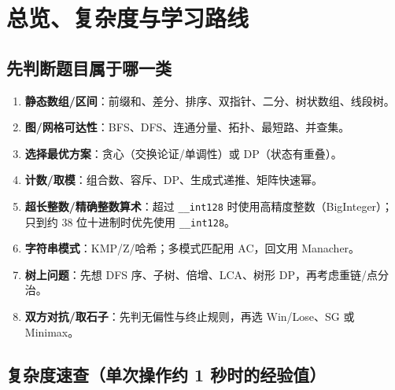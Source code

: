 \chapter{总览、复杂度与学习路线}\label{ux603bux89c8ux590dux6742ux5ea6ux4e0eux5b66ux4e60ux8defux7ebf}

\section{先判断题目属于哪一类}\label{ux5148ux5224ux65adux9898ux76eeux5c5eux4e8eux54eaux4e00ux7c7b}

\begin{enumerate}
\def\labelenumi{\arabic{enumi}.}
\tightlist
\item
  \textbf{静态数组/区间}：前缀和、差分、排序、双指针、二分、树状数组、线段树。
\item
  \textbf{图/网格可达性}：BFS、DFS、连通分量、拓扑、最短路、并查集。
\item
  \textbf{选择最优方案}：贪心（交换论证/单调性）或 DP（状态有重叠）。
\item
  \textbf{计数/取模}：组合数、容斥、DP、生成式递推、矩阵快速幂。
\item
  \textbf{超长整数/精确整数算术}：超过 \passthrough{\lstinline!__int128!} 时使用高精度整数（BigInteger）；只到约 38 位十进制时优先使用 \passthrough{\lstinline!__int128!}。
\item
  \textbf{字符串模式}：KMP/Z/哈希；多模式匹配用 AC，回文用 Manacher。
\item
  \textbf{树上问题}：先想 DFS 序、子树、倍增、LCA、树形 DP，再考虑重链/点分治。
\item
  \textbf{双方对抗/取石子}：先判无偏性与终止规则，再选 Win/Lose、SG 或 Minimax。
\end{enumerate}

\section{复杂度速查（单次操作约 1 秒时的经验值）}\label{ux590dux6742ux5ea6ux901fux67e5ux5355ux6b21ux64cdux4f5cux7ea6-1-ux79d2ux65f6ux7684ux7ecfux9a8cux503c}

